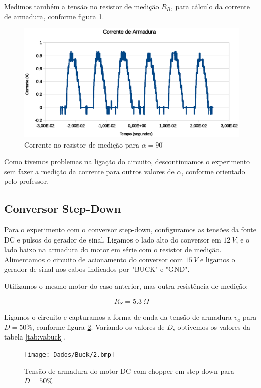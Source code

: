 \documentclass{article}
\begin{document}
Medimos também a tensão no resistor de medição $R_R$, para cálculo da corrente de armadura, conforme figura \ref{fig:iaret}.
\begin{figure}[H]
	\centering
	\includegraphics[width=\linewidth]{Dados/Retificador/corrente}
	\caption{Corrente no resistor de medição para $\alpha=90^\circ$}
	\label{fig:iaret}
\end{figure}

Como tivemos problemas na ligação do circuito, descontinuamos o experimento sem fazer a medição da corrente para outros valores de $\alpha$, conforme orientado pelo professor.

\subsection{Conversor Step-Down}
Para o experimento com o conversor step-down, configuramos as tensões da fonte DC e pulsos do gerador de sinal. Ligamos o lado alto do conversor em $12\ V$, e o lado baixo na armadura do motor em série com o resistor de medição. Alimentamos o circuito de acionamento do conversor com $15\ V$ e ligamos o gerador de sinal nos cabos indicados por "BUCK" e "GND".

Utilizamos o mesmo motor do caso anterior, mas outra resistência de medição:

\begin{equation}
R_S=5.3\ \Omega
\end{equation}

Ligamos o circuito e capturamos a forma de onda da tensão de armadura $v_a$ para $D=50\%$, conforme figura \ref{fig:vabuck}. Variando os valores de $D$, obtivemos os valores da tabela \ref{tab:vabuck}.

\begin{figure}[H]
	\centering
	\texttt{[image: Dados/Buck/2.bmp]}
	\caption{Tensão de armadura do motor DC com chopper em step-down para $D=50\%$}
	\label{fig:vabuck}
\end{figure}
\end{document}
